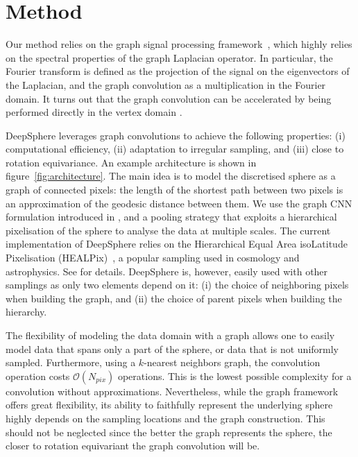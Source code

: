 \documentclass{article} %
\newcommand{\figref}[1]{figure~\ref{fig:#1}}
\newcommand{\1}{\b{1}}              %
\newcommand{\0}{\b{0}}              %
\newcommand{\todo}[1]{{\color[rgb]{.6,.1,.6}{#1}}}
\begin{document}
\section{Method}

Our method relies on the graph signal processing framework~\citep{shuman2013gsp}, which highly relies on the spectral properties of the graph Laplacian operator.
In particular, the Fourier transform is defined as the projection of the signal on the eigenvectors of the Laplacian, and the graph convolution as a multiplication in the Fourier domain.
It turns out that the graph convolution can be accelerated by being performed directly in the vertex domain
\citep{hammond2011wavelets}.

DeepSphere leverages graph convolutions
to achieve the following properties: (i) computational efficiency, (ii) adaptation to irregular sampling, and (iii) close to rotation equivariance.
An example architecture is shown in \figref{architecture}.
The main idea is to model the discretised sphere as a graph of connected pixels: the length of the shortest path between two pixels is an approximation of the geodesic distance between them.
We use the graph CNN formulation introduced in \citep{defferrard2016convolutional}, and a pooling strategy that exploits a hierarchical pixelisation of the sphere to analyse the data at multiple scales.
The current implementation of DeepSphere relies on the Hierarchical Equal Area isoLatitude Pixelisation (HEALPix)~\citep{gorski2005healpix}, a popular sampling used in cosmology and astrophysics.
See \citet{perraudin2018deepsphere} for details.
DeepSphere is, however, easily used with other samplings as only two elements depend on it: (i) the choice of neighboring pixels when building the graph, and (ii) the choice of parent pixels when building the hierarchy.

The flexibility of modeling the data domain with a graph allows one to easily model data that spans only a part of the sphere, or data that is not uniformly sampled.
Furthermore, using a $k$-nearest neighbors graph, the convolution operation costs $\mathcal{O}(N_{pix})$ operations.
This is the lowest possible complexity for a convolution without approximations.
Nevertheless, while the graph framework offers great flexibility, its ability to faithfully represent the underlying sphere highly depends on the sampling locations and the graph construction.
This should not be neglected since the better the graph represents the sphere, the closer to rotation equivariant the graph convolution will be.
\end{document}
